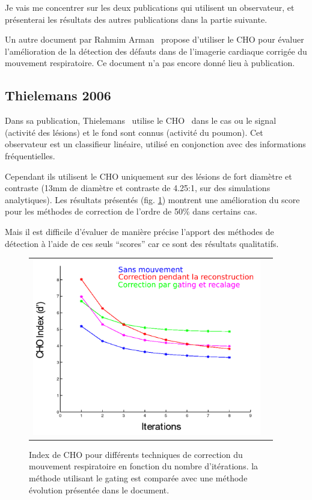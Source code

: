 Je vais me concentrer sur les deux publications qui utilisent un observateur, et présenterai les résultats des autres publications dans la partie suivante.

Un autre document par Rahmim Arman~\cite{rahmim4d} propose d'utiliser le CHO pour évaluer l'amélioration de la détection des défauts dans de l'imagerie cardiaque corrigée du mouvement respiratoire. Ce document n'a pas encore donné lieu à publication.

\subsection{Thielemans 2006}

Dans sa publication, Thielemans~\cite{Thielemans2006Lesion} utilise le CHO~\cite{barrett1993model} dans le cas ou le signal (activité des lésions) et le fond sont connus (activité du poumon). Cet observateur est un classifieur linéaire, utilisé en conjonction avec des informations fréquentielles. 

Cependant ils utilisent le CHO uniquement sur des lésions de fort diamètre et contraste (13mm de diamètre et contraste de 4.25:1, sur des simulations analytiques). Les résultats présentés (fig. \ref{fig:apportCHO}) montrent une amélioration du score pour les méthodes de correction de l'ordre de 50\% dans certains cas. 

Mais il est difficile d'évaluer de manière précise l'apport des méthodes de détection à l'aide de ces seuls ``scores'' car ce sont des résultats qualitatifs. 

\begin{figure}[h!]
	\begin{center}
		\begin{tabular}{c c}
			\includegraphics[width=10cm]{images/apportCHO}
		\end{tabular}
	\end{center}
	\caption{Index de CHO pour différents techniques de correction du mouvement respiratoire en fonction du nombre d'itérations. la méthode utilisant le gating est comparée avec une méthode évolution présentée dans le document.} 
	\label{fig:apportCHO}
\end{figure}


